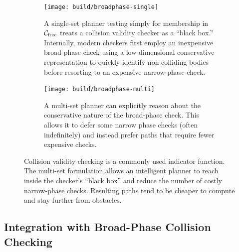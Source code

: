 \begin{figure}
\centering

\begin{subfigure}[t]{\linewidth}
\centering
\texttt{[image: build/broadphase-single]}
\caption{A single-set planner testing simply for membership in
  $\mathcal{C}_{\mbox{\scriptsize free}}$
  treats a collision validity checker as a
  ``black box.''
  Internally,
  modern checkers first employ an inexpensive broad-phase check
  using a low-dimensional conservative representation
  to quickly identify non-colliding bodies before
  resorting to an expensive narrow-phase check.}
\end{subfigure}

\vspace{0.2in}

\begin{subfigure}[t]{\linewidth}
\centering
\texttt{[image: build/broadphase-multi]}
\caption{A multi-set planner can explicitly reason about the
  conservative nature of the broad-phase check.
  This allows it to defer some narrow phase checks
  (often indefinitely)
  and instead prefer paths that require fewer expensive checks.}
\end{subfigure}

\caption{Collision validity checking is a commonly used
  indicator function.
  The multi-set formulation allows an intelligent planner to
  reach inside the checker's ``black box'' and reduce the number
  of costly narrow-phase checks.
  Resulting paths tend to be cheaper to compute and
  stay further from obstacles.}
\label{fig:broad-phase}
\end{figure}

\subsection{Integration with Broad-Phase Collision Checking}
\label{subsec:broad-phase}

